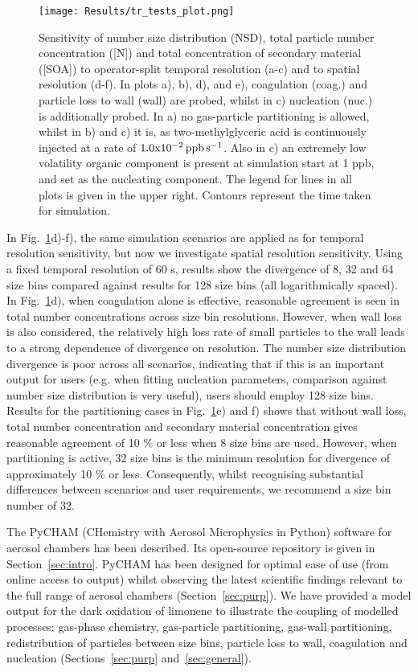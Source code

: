 \documentclass[gmd, manuscript]{copernicus}
\begin{document}
\begin{figure}[t]
\texttt{[image: Results/tr\_tests\_plot.png]}
\caption{Sensitivity of number size distribution (NSD), total particle number concentration ([N]) and total concentration of secondary material ([SOA]) to operator-split temporal resolution (a-c) and to spatial resolution (d-f).  In plots a), b), d), and e), coagulation (coag.) and particle loss to wall (wall) are probed, whilst in c) nucleation (nuc.) is additionally probed.  In a) no gas-particle partitioning is allowed, whilst in b) and c) it is, as two-methylglyceric acid is continuously injected at a rate of $\rm{1.0x10^{-2}\, ppb \, s^{-1}}$.  Also in c) an extremely low volatility organic component is present at simulation start at 1 ppb, and set as the nucleating component.  The legend for lines in all plots is given in the upper right.  Contours represent the time taken for simulation.}
\label{fig:tr_tests_plot}
\end{figure}

In Fig.~\ref{fig:tr_tests_plot}d)-f), the same simulation scenarios are applied as for temporal resolution sensitivity, but now we investigate spatial resolution sensitivity.  Using a fixed temporal resolution of 60 s, results show the divergence of 8, 32 and 64 size bins compared against results for 128 size bins (all logarithmically spaced).  In Fig.~\ref{fig:tr_tests_plot}d), when coagulation alone is effective, reasonable agreement is seen in total number concentrations across size bin resolutions.  However, when wall loss is also considered, the relatively high loss rate of small particles to the wall leads to a strong dependence of divergence on resolution.  The number size distribution divergence is poor across all scenarios, indicating that if this is an important output for users (e.g. when fitting nucleation parameters, comparison against number size distribution is very useful), users should employ 128 size bins.  Results for the partitioning cases in Fig.~\ref{fig:tr_tests_plot}e) and f) shows that without wall loss, total number concentration and secondary material concentration gives reasonable agreement of 10 \% or less when 8 size bins are used.  However, when partitioning is active, 32 size bins is the minimum resolution for divergence of approximately 10 \% or less.  Consequently, whilst recognising substantial differences between scenarios and user requirements, we recommend a size bin number of 32.


\conclusions
The PyCHAM (CHemistry with Aerosol Microphysics in Python) software for aerosol chambers has been described.  Its open-source repository is given in Section~\ref{sec:intro}.  PyCHAM has been designed for optimal ease of use (from online access to output) whilst observing the latest scientific findings relevant to the full range of aerosol chambers (Section~\ref{sec:purp}).  We have provided a model output for the dark oxidation of limonene to illustrate the coupling of modelled processes: gas-phase chemistry, gas-particle partitioning, gas-wall partitioning, redistribution of particles between size bins, particle loss to wall, coagulation and nucleation (Sections~\ref{sec:purp} and~\ref{sec:general}).
\end{document}
